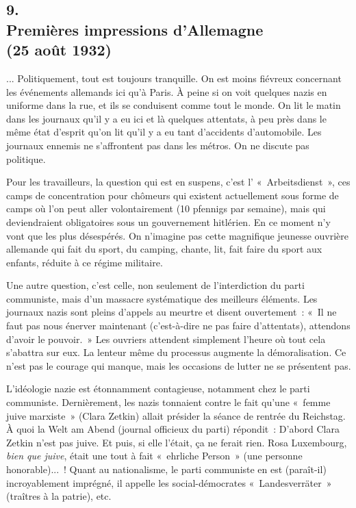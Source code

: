 \documentclass[french,twoside]{book} %
\begin{document}
\subsection[{9. Premières impressions d'Allemagne  (25 août 1932)}]{9. \\
Premières impressions d'Allemagne \protect\footnotemark  \\
(25 août 1932)}
\noindent \par
... Politiquement, tout est toujours tranquille. On est moins fiévreux concernant les événements allemands ici qu'à Paris. À peine si on voit quelques nazis en uniforme dans la rue, et ils se conduisent comme tout le monde. On lit le matin dans les journaux qu'il y a eu ici et là quelques attentats, à peu près dans le même état d'esprit qu'on lit qu'il y a eu tant d'accidents d'automobile. Les journaux ennemis ne s'affrontent pas dans les métros. On ne discute pas politique.\par
Pour les travailleurs, la question qui est en suspens, c'est l' « Arbeitsdienst », ces camps de concentration pour chômeurs qui existent actuellement sous forme de camps où l'on peut aller volontairement (10 pfennigs par semaine), mais qui deviendraient obligatoires sous un gouverne­ment hitlérien. En ce moment n'y vont que les plus désespérés. On n'imagine pas cette magnifique jeunesse ouvrière allemande qui fait du sport, du cam­ping, chante, lit, fait faire du sport aux enfants, réduite à ce régime militaire.\par
Une autre question, c'est celle, non seulement de l'interdiction du parti communiste, mais d'un massacre systématique des meilleurs éléments. Les journaux nazis sont pleins d'appels au meurtre et disent ouvertement : « Il ne faut pas nous énerver maintenant (c'est-à-dire ne pas faire d'attentats), attendons d'avoir le pouvoir. » Les ouvriers attendent simplement l'heure où tout cela s'abattra sur eux. La lenteur même du processus augmente la démora­lisation. Ce n'est pas le courage qui manque, mais les occasions de lutter ne se présentent pas.\par
L'idéologie nazie est étonnamment contagieuse, notamment chez le parti communiste. Dernièrement, les nazis tonnaient contre le fait qu'une « femme juive marxiste » (Clara Zetkin) allait présider la séance de rentrée du Reichstag. À quoi la Welt am Abend (journal officieux du parti) répondit : D'abord Clara Zetkin n'est pas juive. Et puis, si elle l'était, ça ne ferait rien. Rosa Luxembourg, {\itshape bien que juive}, était une tout à fait « ehrliche Person » (une personne honorable)... ! Quant au nationalisme, le parti communiste en est (paraît-il) incroyablement imprégné, il appelle les social-démocrates « Landesverräter » (traîtres à la patrie), etc.\par
\end{document}

